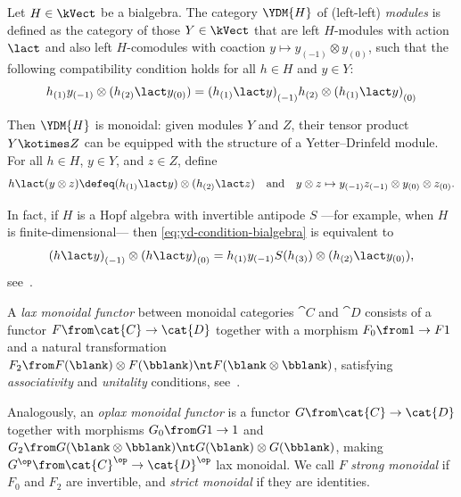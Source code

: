 \begin{example}\label{ex:yd-modules-def-and-monoidal}
  Let \(H \in \kVect\) be a bialgebra.
  The category \(\YDM{H}\) of (left-left) \emph{\YetterDrinfeld{} modules} is defined as the category
  of those \(Y \in \kVect\) that are left \(H\)\hyp{}modules with action \(\lact\)
  and also left \(H\)\hyp{}comodules with coaction \(y \mapsto y_{(-1)} \otimes y_{(0)}\),
  such that the following compatibility condition holds for all \(h \in H\) and \(y \in Y\):
  \begin{equation}\label{eq:yd-condition-bialgebra}
    h_{(1)}y_{(-1)} \otimes (h_{(2)} \lact y_{(0)}) = {(h_{(1)} \lact y)}_{(-1)} h_{(2)} \otimes {(h_{(1)} \lact y)}_{(0)}
  \end{equation}

  Then \(\YDM{H}\) is monoidal: given \YetterDrinfeld{} modules \(Y\) and \(Z\),
  their tensor product \(Y \kotimes Z\) can be equipped with the structure of a Yetter–Drinfeld module.
  For all \(h \in H\), \(y \in Y\), and \(z \in Z\), define
  \[
    h \lact (y \otimes z) \defeq (h_{(1)} \lact y) \otimes (h_{(2)} \lact z)
    \quad\text{and}\quad
    y \otimes z \mapsto y_{(-1)}z_{(-1)} \otimes y_{(0)} \otimes z_{(0)}.
  \]

  In fact, if \(H\) is a Hopf algebra with invertible antipode \(S\)%
  —for example, when \(H\) is finite\hyp{}dimensional—%
  then \cref{eq:yd-condition-bialgebra} is equivalent to
  \begin{equation}\label{eq:yd-condition}
    {(h \lact y)}_{(-1)} \otimes {(h \lact y)}_{(0)} = h_{(1)}y_{(-1)}S(h_{(3)}) \otimes (h_{(2)} \lact y_{(0)}),
  \end{equation}
  see~\cite[Proposition~10.6.16]{montgomery93:hopf}.
\end{example}

\begin{definition}\label{def:monoidal-functors}
  A \emph{lax monoidal functor} between monoidal categories \(\cat{C}\)
  and \(\cat{D}\)
  consists of a functor \(F\from \cat{C} \to \cat{D}\)
  together with a morphism \(F_0 \from 1 \to F1\)
  and a natural transformation \(F_2 \from F(\blank) \otimes F(\bblank) \nt F(\blank \otimes \bblank)\),
  satisfying \emph{associativity} and \emph{unitality} conditions, see~\cite[Definition~2.4.1]{Etingof2015}.

  Analogously, an \emph{oplax monoidal functor} is a functor \(G\from \cat{C} \to \cat{D}\)
  together with morphisms \(G_0\from G1 \to 1\) and \(G_2 \from G(\blank \otimes \bblank) \nt G(\blank) \otimes G(\bblank)\),
  making \(G^{\op}\from \cat{C}^{\op} \to \cat{D}^{\op}\) lax monoidal.
  We call \(F\) \emph{strong monoidal}
  if \(F_0\) and \(F_2\) are invertible,
  and \emph{strict monoidal} if they are identities.
\end{definition}

